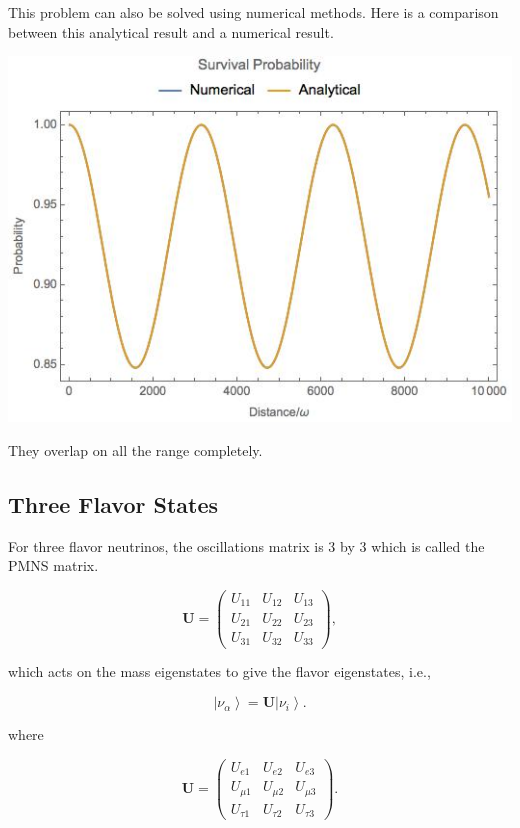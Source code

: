 \documentclass{tufte-handout}
\newcommand{\ket}[1]{\left| #1\right\rangle}
\begin{document}
This problem can also be solved using numerical methods. Here is a comparison between this analytical result and a numerical result.

\begin{marginfigure}
\includegraphics{assets/vacuumOsc}
\caption{They overlap on all the range completely.}
\end{marginfigure}




\subsection{Three Flavor States}

For three flavor neutrinos, the oscillations matrix is 3 by 3 which is called the PMNS matrix.

\begin{equation*}
\mathbf U = \begin{pmatrix}
U_{11} & U_{12} & U_{13} \\
U_{21} & U_{22} & U_{23} \\
U_{31} & U_{32} & U_{33}
\end{pmatrix},
\end{equation*}

which acts on the mass eigenstates to give the flavor eigenstates, i.e.,

\begin{equation*}
\ket{\nu_\alpha}= \mathbf{U}\ket{\nu_i}.
\end{equation*}

where

\begin{equation*}
\mathbf{U} = \begin{pmatrix}
U_{e1} & U_{e2} & U_{e3} \\
U_{\mu 1} & U_{\mu 2} & U_{\mu 3}\\
U_{\tau 1} & U_{\tau 2} & U_{\tau 3}
\end{pmatrix}.
\end{equation*}
\end{document}
